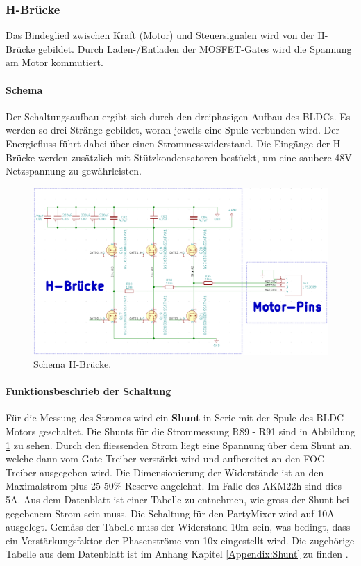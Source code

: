 \subsubsection{H-Brücke}
\label{subsubsec:H-Brücke}

Das Bindeglied zwischen Kraft (Motor) und Steuersignalen wird von der H-Brücke gebildet. Durch Laden-/Entladen der MOSFET-Gates wird die Spannung am Motor kommutiert.

\paragraph{Schema}\mbox{}

Der Schaltungsaufbau ergibt sich durch den dreiphasigen Aufbau des BLDCs. Es werden so drei Stränge gebildet, woran jeweils eine Spule verbunden wird. Der Energiefluss führt dabei über einen Strommesswiderstand. Die Eingänge der H-Brücke werden zusätzlich mit Stützkondensatoren bestückt, um eine saubere 48V-Netzspannung zu gewährleisten.

\begin{figure}[H]
	\centering
	\includegraphics[width=\textwidth]{graphics/Schema_H_Bruecke_und_BLDC}
	\caption{Schema H-Brücke.}
	\label{fig:Schema_H_Bruecke_und_BLDC}
\end{figure}

\paragraph{Funktionsbeschrieb der Schaltung}\mbox{}

Für die Messung des Stromes wird ein \textbf{Shunt} in Serie mit der Spule des BLDC-Motors geschaltet.
Die Shunts für die Strommessung R89 - R91 sind in Abbildung \ref{fig:Schema_H_Bruecke_und_BLDC} zu sehen. Durch den fliessenden Strom liegt eine Spannung über dem Shunt an, welche dann vom Gate-Treiber verstärkt wird und aufbereitet an den FOC-Treiber ausgegeben wird. Die Dimensionierung der Widerstände ist an den Maximalstrom plus 25-50\% Reserve angelehnt. Im Falle des AKM22h sind dies 5A. Aus dem Datenblatt ist einer Tabelle zu entnehmen, wie gross der Shunt bei gegebenem Strom sein muss. Die Schaltung für den PartyMixer wird auf 10A ausgelegt. Gemäss der Tabelle muss der Widerstand 10m\textOmega\ sein, was bedingt, dass ein Verstärkungsfaktor der Phasenströme von 10x eingestellt wird. Die zugehörige Tabelle aus dem Datenblatt ist im Anhang Kapitel \ref{Appendix:Shunt} zu finden \cite[S.31]{trinamicmotion_control_gmbh__co_kg_tmc6200_2019}.

